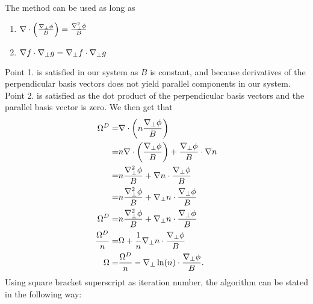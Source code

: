 The method can be used as long as
%
\begin{enumerate}
    \item $\nabla\cdot\left(\frac{\nabla_\perp\phi}{B}\right) = \frac{\nabla_\perp^2\phi}{B}$
    \item $\nabla f \cdot \nabla_\perp g = \nabla_\perp f \cdot \nabla_\perp g$
\end{enumerate}
%
Point 1. is satisfied in our system as $B$ is constant, and because derivatives of the perpendicular basis vectors does not yield parallel components in our system.
Point 2. is satisfied as the dot product of the perpendicular basis vectors and the parallel basis vector is zero.
We then get that
%
\begin{align*}
    \Omega^D =& \nabla\cdot\left(n\frac{\nabla_\perp\phi}{B}\right)\\
    =& n\nabla\cdot\left(\frac{\nabla_\perp\phi}{B}\right) +
    \frac{\nabla_\perp\phi}{B}\cdot\nabla n
    \\
    =& n\frac{\nabla_\perp^2\phi}{B} +
    \nabla n\cdot\frac{\nabla_\perp\phi}{B}
    \\
    =& n\frac{\nabla_\perp^2\phi}{B} +
    \nabla_\perp n\cdot\frac{\nabla_\perp\phi}{B}
    \\
    \Omega^D =& n\frac{\nabla_\perp^2\phi}{B} +
    \nabla_\perp n\cdot\frac{\nabla_\perp\phi}{B}
    \\
    \frac{\Omega^D}{n} =& \Omega +
    \frac{1}{n}\nabla_\perp n\cdot\frac{\nabla_\perp\phi}{B}
    \\
    \Omega =& \frac{\Omega^D}{n} -
    \nabla_\perp \ln(n) \cdot\frac{\nabla_\perp\phi}{B}.
\end{align*}
%
Using square bracket superscript as iteration number, the algorithm can be stated in the following way:
%
